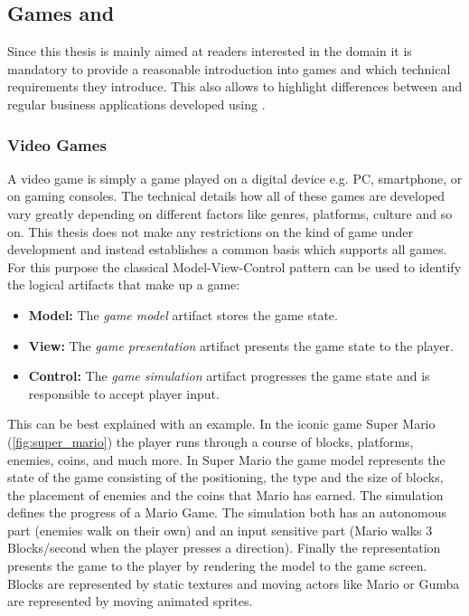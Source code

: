 \subsection{Games and \ogsucuc{}}
\label{sub:games}

Since this thesis is mainly aimed at readers interested in the \ms{} domain it
is mandatory to provide a reasonable introduction into games and which technical
requirements they introduce. This also allows to highlight differences between
\ogs{} and regular business applications developed using \mss{}.

\subsubsection{Video Games}

A video game is simply a game played on a digital device e.g. PC, smartphone, or
on gaming consoles. The technical details how all of these games are developed
vary greatly depending on different factors like genres, platforms, culture
and so on. This thesis does not make any restrictions on the kind of game
under development and instead establishes a common basis which supports all
games. For this purpose the classical Model-View-Control pattern can be used to
identify the logical artifacts that make up a game: 

\begin{itemize}
  \item \textbf{Model:} The \textit{game model} artifact stores the game state.
  \item \textbf{View:} The \textit{game presentation} artifact presents the game
  state to the player.
  \item \textbf{Control:} The \textit{game simulation} artifact progresses the
  game state and is responsible to accept player input.
\end{itemize}

This can be best explained with an example. In the iconic game Super Mario
(\autoref{fig:super_mario}) the player runs through a course of blocks,
platforms, enemies, coins, and much more. In Super Mario the game model
represents the state of the game consisting of the positioning, the type and the
size of blocks, the placement of enemies and the coins that Mario has earned.
The simulation defines the progress of a Mario Game. The simulation both has an
autonomous part (enemies walk on their own) and an input sensitive part (Mario
walks 3 Blocks/second when the player presses a direction). Finally the
representation presents the game to the player by rendering the model to the
game screen. Blocks are represented by static textures and moving actors like
Mario or Gumba are represented by moving animated \glspl{sprite}.

